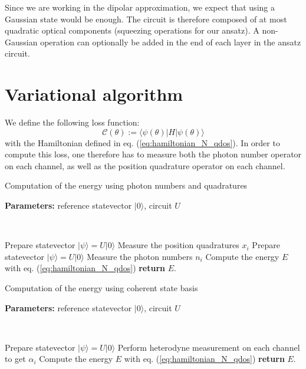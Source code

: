 \documentclass[reprint, amsmath, amssymb, aps]{revtex4-2}
\begin{document}
    Since we are working in the dipolar approximation, we expect that using a Gaussian state would be enough. The circuit is therefore composed of at most quadratic optical components (squeezing operations for our ansatz). A non-Gaussian operation can optionally be added in the end of each layer in the ansatz circuit.

\section{Variational algorithm}

    We define the following loss function:
    \begin{equation}
        \mathcal C(\theta) := \langle\psi(\theta)|H|\psi(\theta)\rangle
    \end{equation}
    with the Hamiltonian defined in eq. (\ref{eq:hamiltonian_N_qdos}).
    In order to compute this loss, one therefore has to measure both the photon number operator on each channel, as well as the position quadrature operator on each channel.
    \newpage

    \begin{algorithm}
        \caption{Computation of the energy using photon numbers and quadratures}\label{alg:energy_computation}
            \textbf{Parameters:} reference statevector $|0\rangle$, circuit $U$

            \

            Prepare statevector $|\psi\rangle = U|0\rangle$\;
            Measure the position quadratures $x_i$\;
            Prepare statevector $|\psi\rangle = U|0\rangle$\;
            Measure the photon numbers $n_i$\;
            Compute the energy $E$ with eq. (\ref{eq:hamiltonian_N_qdos})\;
            \textbf{return} $E$.
    \end{algorithm}

    \begin{algorithm}
        \caption{Computation of the energy using coherent state basis}\label{alg:energy_computation_coherent_basis}
            \textbf{Parameters:} reference statevector $|0\rangle$, circuit $U$

            \

            Prepare statevector $|\psi\rangle = U|0\rangle$\;
            Perform heterodyne measurement on each channel to get $\alpha_i$\;
            Compute the energy $E$ with eq. (\ref{eq:hamiltonian_N_qdos})\;
            \textbf{return} $E$.
    \end{algorithm}
\end{document}
